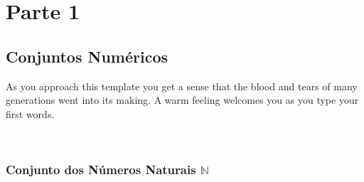 \documentclass[11pt,fleqn]{book} %
\begin{document}



\pagestyle{empty} %

\tableofcontents %
\cleardoublepage %

\pagestyle{fancy} %


\part{Parte 1}



\chapter{Conjuntos Numéricos}


\begin{quotebox}
	As you approach this template you get a sense that the blood and tears of many generations went into its making. A warm feeling welcomes you as you type your first words.
\end{quotebox}




\

\section{Conjunto dos Números Naturais $\mathbb{N}$}
\end{document}
